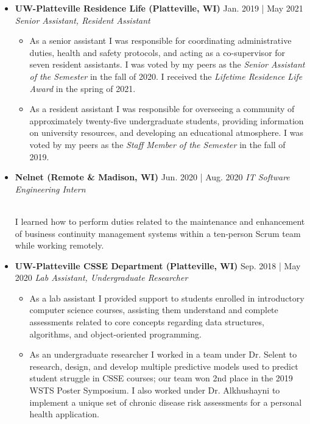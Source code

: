 \documentclass[11pt]{article}
\newcommand{\job}[3]{\vspace{1.5mm}
  \textbf{#1} \hfill #2 \linebreak \textit{#3}
}
\begin{document}
\begin{itemize}[leftmargin=*]
\begin{itemize}
	      \end{itemize}
	\item[]
	      \job
	      {UW-Platteville Residence Life (Platteville, WI)}
	      {Jan. 2019 | May 2021}
	      {Senior Assistant, Resident Assistant}
	      \begin{itemize}
	      	\item As a senior assistant I was responsible for coordinating administrative duties, health and safety protocols, and acting as a co-supervisor for seven resident assistants. I was voted by my peers as the \emph{Senior Assistant of the Semester} in the fall of 2020. I received the \emph{Lifetime Residence Life Award} in the spring of 2021.
	      	\item As a resident assistant I was responsible for overseeing a community of approximately twenty-five undergraduate students, providing information on university resources, and developing an educational atmosphere. I was voted by my peers as the \emph{Staff Member of the Semester} in the fall of 2019.
	      \end{itemize}
	\item[]
	      \job
	      {Nelnet (Remote \& Madison, WI)}
	      {Jun. 2020 | Aug. 2020}
	      {IT Software Engineering Intern}
	      {\\I learned how to perform duties related to the maintenance and enhancement of business continuity management systems within a ten-person Scrum team while working remotely.}
	\item[]
	      \job
	      {UW-Platteville CSSE Department (Platteville, WI)}
	      {Sep. 2018 | May 2020}
	      {Lab Assistant, Undergraduate Researcher}
	      \begin{itemize}
		\item As a lab assistant I provided support to students enrolled in introductory computer science courses, assisting them understand and complete assessments related to core concepts regarding data structures, algorithms, and object-oriented programming.
	      	\item As an undergraduate researcher I worked in a team under Dr. Selent to research, design, and develop multiple predictive models used to predict student struggle in CSSE courses; our team won 2nd place in the 2019 WSTS Poster Symposium. I also worked under Dr. Alkhushayni to implement a unique set of chronic disease risk assessments for a personal health application.
	      \end{itemize}
\end{itemize}
\end{document}
